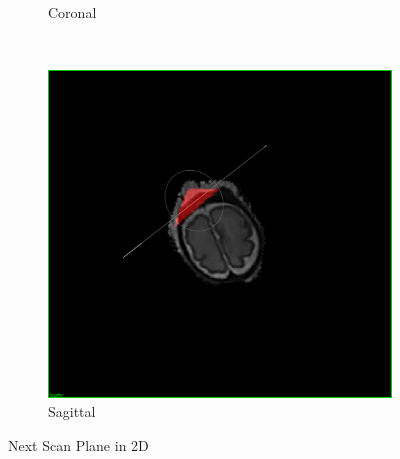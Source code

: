 \begin{figure}[H]
\begin{subfigure}[b]{0.3\textwidth}
    \caption*{Coronal}
    \label{fig:nextscanplanecoronal}
  \end{subfigure}%
  ~%
  \begin{subfigure}[b]{0.3\textwidth}
    \includegraphics[width=\textwidth]{images/next_scan_plane/sagittal.png}
    \caption*{Sagittal}
    \label{fig:nextscanplanesagittal}
  \end{subfigure}
  \caption{Next Scan Plane in 2D}\label{fig:nextscanplane2d}
\end{figure}